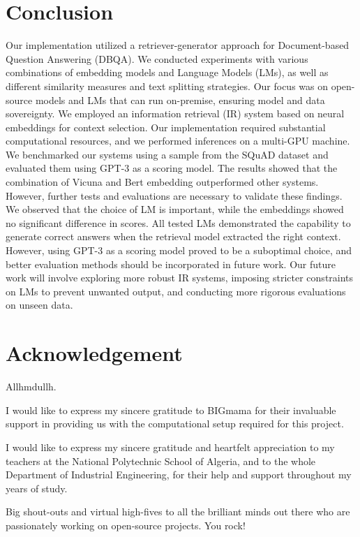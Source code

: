 \documentclass[a4paper,12pt]{article}
\begin{document}
\section{Conclusion}
Our implementation utilized a retriever-generator approach for Document-based Question Answering (DBQA). 
We conducted experiments with various combinations of embedding models and Language Models (LMs), as well as different similarity measures and text splitting strategies. Our focus was on open-source models and LMs that can run on-premise, ensuring model and data sovereignty.
We employed an information retrieval (IR) system based on neural embeddings for context selection. 
Our implementation required substantial computational resources, and we performed inferences on a multi-GPU machine.
We benchmarked our systems using a sample from the SQuAD dataset and evaluated them using GPT-3 \cite{gpt3} as a scoring model. The results showed that the combination of Vicuna \cite{vicuna} and Bert \cite{bert} embedding outperformed other systems. 
However, further tests and evaluations are necessary to validate these findings.
We observed that the choice of LM is important, while the embeddings showed no significant difference in scores. All tested LMs demonstrated the capability to generate correct answers when the retrieval model extracted the right context. 
However, using GPT-3 as a scoring model proved to be a suboptimal choice, and better evaluation methods should be incorporated in future work.
Our future work will involve exploring more robust IR systems, imposing stricter constraints on LMs to prevent unwanted output, and conducting more rigorous evaluations on unseen data.

\section{Acknowledgement}
Allhmdullh.

I would like to express my sincere gratitude to BIGmama for their invaluable support in providing us with the computational setup required for this project.

I would like to express my sincere gratitude and heartfelt appreciation to my teachers at the National Polytechnic School of Algeria, 
and to the whole Department of Industrial Engineering, for their help and support throughout my years of study.

Big shout-outs and virtual high-fives to all the brilliant minds out there who are passionately working on open-source projects. You rock!
\end{document}

